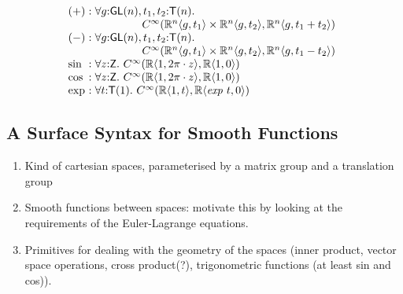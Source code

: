 \documentclass[preprint]{sigplanconf}
\theoremstyle{examplestyle}
\begin{document}
\begin{displaymath}
  \begin{array}{l@{\hspace{0.3em}}c@{\hspace{0.3em}}l}
    (+) &:&
    \begin{array}[t]{@{}l}
      \forall g \mathord: \mathsf{GL}(n), t_1,t_2 \mathord: \mathsf{T}(n). \\
      \hspace{1.5cm} C^\infty(\mathbb{R}^n\langle g, t_1 \rangle \times \mathbb{R}^n\langle g, t_2 \rangle, \mathbb{R}^n\langle g, t_1 + t_2 \rangle)\\
    \end{array} \\
    (-) &:&
    \begin{array}[t]{@{}l}
      \forall g \mathord: \mathsf{GL}(n), t_1,t_2 \mathord: \mathsf{T}(n). \\
      \hspace{1.5cm} C^\infty(\mathbb{R}^n\langle g, t_1 \rangle \times \mathbb{R}^n\langle g, t_2 \rangle, \mathbb{R}^n\langle g, t_1 - t_2 \rangle)\\
    \end{array} \\
    \sin &:& \forall z \mathord: \mathsf{Z}.~C^\infty(\mathbb{R}\langle 1, 2\pi \cdot z \rangle, \mathbb{R} \langle 1, 0 \rangle) \\
    \cos &:& \forall z \mathord: \mathsf{Z}.~C^\infty(\mathbb{R}\langle 1, 2\pi \cdot z \rangle, \mathbb{R} \langle 1, 0 \rangle) \\
    \mathrm{exp} &:& \forall t \mathord: \mathsf{T}(1).~C^\infty(\mathbb{R}\langle 1, t \rangle, \mathbb{R}\langle \mathit{exp}~t, 0 \rangle)
  \end{array}
\end{displaymath}

\subsection{A Surface Syntax for Smooth Functions}

\begin{enumerate}
\item Kind of cartesian spaces, parameterised by a matrix group and a
  translation group
\item Smooth functions between spaces: motivate this by looking at the
  requirements of the Euler-Lagrange equations.
\item Primitives for dealing with the geometry of the spaces (inner
  product, vector space operations, cross product(?), trigonometric
  functions (at least sin and cos)).
\end{enumerate}
\end{document}
